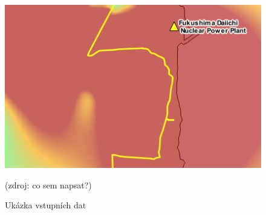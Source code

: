 			\begin{figure}[H]
    			\centering
      			\includegraphics[scale=0.7]{./pictures/ukazka_vstupnich_dat.png}
      				\caption[Ukázka vstupních dat]{Ukázka vstupních dat}(zdroj: co sem napsat?)
     				\label{fig:vstup}
  			\end{figure}
  			
